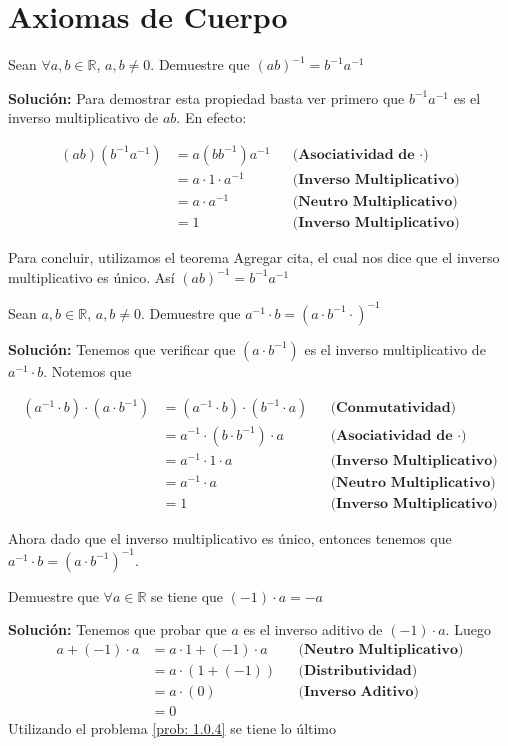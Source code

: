 \documentclass[12pt]{book}
\begin{document}
\chapter{Axiomas de Cuerpo}

\begin{prob}
\quad \quad
Sean $\forall a,b \in \mathbb{R}$, $a,b\neq 0$. Demuestre que $(ab)^{-1}=b^{-1}a^{-1}$ 
\end{prob}
\textbf{Solución:}
Para demostrar esta propiedad basta ver primero que $b^{-1}a^{-1}$ es el inverso multiplicativo de $ab$. En efecto:

\begin{align*}
    (ab)(b^{-1}a^{-1})&=a(bb^{-1})a^{-1} && \textbf{(Asociatividad de $\cdot$)} \\
    &= a \cdot 1 \cdot a^{-1} && \textbf{(Inverso Multiplicativo)} \\
    &= a \cdot a^{-1} && \textbf{(Neutro Multiplicativo)} \\
    &= 1 && \textbf{(Inverso Multiplicativo)}
\end{align*}

Para concluir, utilizamos el teorema {\Large Agregar cita}, el cual nos dice que el inverso multiplicativo es único. Así $(ab)^{-1}=b^{-1} a^{-1}$

\begin{prob}
    \quad \quad
Sean $a,b \in \mathbb{R}$, $a,b \neq 0$. Demuestre que $a^{-1}\cdot b= ( a \cdot b^{-1}\cdot)^{-1}$
\end{prob}
\textbf{Solución:}
Tenemos que verificar que $( a \cdot b^{-1})$ es el inverso multiplicativo de $a^{-1}\cdot b$. Notemos que 

\begin{align*}
    (a^{-1}\cdot b) \cdot (a \cdot b^{-1}) &=   (a^{-1}\cdot b) \cdot ( b^{-1}\cdot a ) && \textbf{(Conmutatividad)} \\
    &=  a^{-1} \cdot (b \cdot b^{-1}) \cdot a  && \textbf{(Asociatividad de $\cdot$)} \\
    &=  a^{-1} \cdot 1 \cdot a && \textbf{(Inverso Multiplicativo)} \\
    &= a^{-1} \cdot a && \textbf{(Neutro Multiplicativo)} \\
    &= 1 && \textbf{(Inverso Multiplicativo)}
\end{align*}

Ahora dado que el inverso multiplicativo es único, entonces tenemos que $a^{-1}\cdot b= (a \cdot b^{-1})^{-1}$.

\begin{prob}
    \quad \quad 
    Demuestre que $\forall a \in \mathbb{R}$ se tiene que $(-1)\cdot a = -a$
\end{prob}
\textbf{Solución:} 
Tenemos que probar que $a$ es el inverso aditivo de $(-1) \cdot a$. Luego 
\begin{align*}
    a + (-1)\cdot a  &= a \cdot 1 + (-1)\cdot a && \textbf{(Neutro Multiplicativo)} \\
    &= a \cdot (1+(-1)) && \textbf{(Distributividad)} \\
    &= a \cdot (0) && \textbf{(Inverso Aditivo)} \\
    &= 0 
\end{align*}
Utilizando el problema \ref{prob: 1.0.4} se tiene lo último
\end{document}

